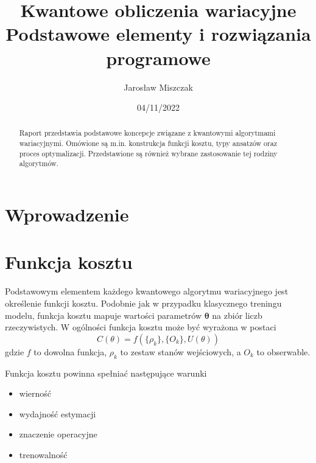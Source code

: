 \documentclass[a4paper,11pt
]{article}
\begin{document}
\title{Kwantowe obliczenia wariacyjne\\ {\normalsize Podstawowe elementy i rozwiązania programowe}}

\author{Jarosław Miszczak}
\date{04/11/2022}

\maketitle

\begin{abstract}
Raport przedstawia podstawowe koncepcje związane z kwantowymi algorytmami wariacyjnymi. Omówione są m.in. konstrukcja funkcji kosztu, typy ansatzów oraz proces optymalizacji. Przedstawione są również wybrane zastosowanie tej rodziny algorytmów.
\end{abstract}


\hypertarget{wprowadzenie}{%
\section{Wprowadzenie}\label{wprowadzenie}}



\hypertarget{funkcja-kosztu}{%
	\section{Funkcja kosztu}\label{funkcja-kosztu}}

Podstawowym elementem każdego kwantowego algorytmu wariacyjnego jest określenie funkcji kosztu. Podobnie jak w przypadku klasycznego treningu modelu, funkcja kosztu mapuje wartości parametrów $\mathbf{\theta}$ na zbiór liczb rzeczywistych. W ogólności funkcja kosztu może być wyrażona w postaci
\begin{equation}
	C(\theta)  = f(\{\rho_k\}, \{O_k\}, U(\theta))
\end{equation}
gdzie $f$ to dowolna funkcja, $\rho_k$ to zestaw stanów wejściowych, a $O_k$ to obserwable.

Funkcja kosztu powinna spełniać następujące warunki
\begin{itemize}
	\item wierność
	\item wydajność estymacji
	\item znaczenie operacyjne
	\item trenowalność
\end{itemize}
\end{document}
